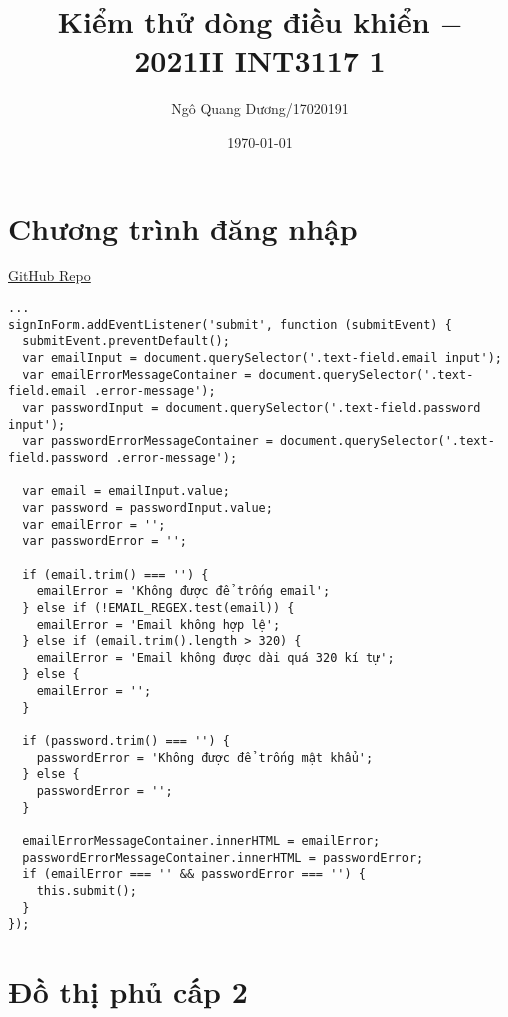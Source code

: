 \documentclass{article}
\title{Kiểm thử dòng điều khiển $-$ 2021II INT3117 1}
\author{Ngô Quang Dương/17020191}
\date{\today}
\begin{document}
\maketitle

\section{Chương trình đăng nhập}

\href{https://github.com/duong755/INT3117_1_2021II}{GitHub Repo}

\begin{verbatim}
...
signInForm.addEventListener('submit', function (submitEvent) {
  submitEvent.preventDefault();
  var emailInput = document.querySelector('.text-field.email input');
  var emailErrorMessageContainer = document.querySelector('.text-field.email .error-message');
  var passwordInput = document.querySelector('.text-field.password input');
  var passwordErrorMessageContainer = document.querySelector('.text-field.password .error-message');

  var email = emailInput.value;
  var password = passwordInput.value;
  var emailError = '';
  var passwordError = '';

  if (email.trim() === '') {
    emailError = 'Không được để trống email';
  } else if (!EMAIL_REGEX.test(email)) {
    emailError = 'Email không hợp lệ';
  } else if (email.trim().length > 320) {
    emailError = 'Email không được dài quá 320 kí tự';
  } else {
    emailError = '';
  }

  if (password.trim() === '') {
    passwordError = 'Không được để trống mật khẩu';
  } else {
    passwordError = '';
  }

  emailErrorMessageContainer.innerHTML = emailError;
  passwordErrorMessageContainer.innerHTML = passwordError;
  if (emailError === '' && passwordError === '') {
    this.submit();
  }
});
\end{verbatim}

\section{Đồ thị phủ cấp 2}
\end{document}
